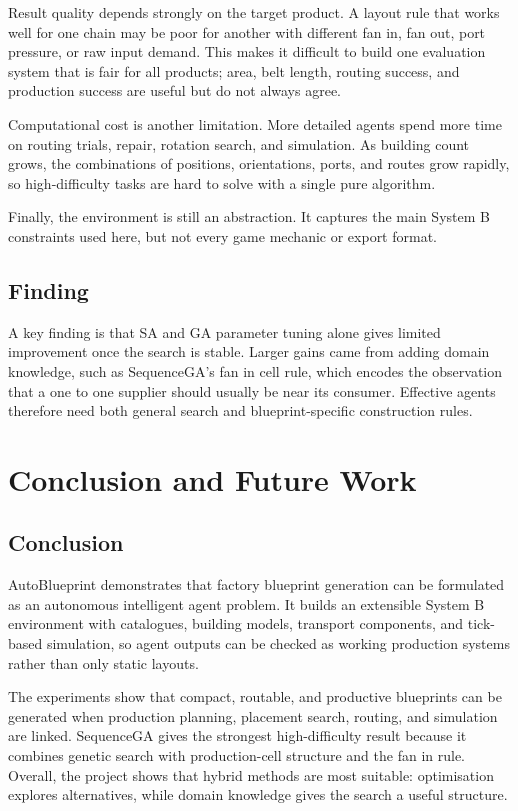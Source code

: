 \documentclass[11pt,a4paper]{article}
\begin{document}
Result quality depends strongly on the target product. A layout rule that works well for one chain may be poor for another with different fan in, fan out, port pressure, or raw input demand. This makes it difficult to build one evaluation system that is fair for all products; area, belt length, routing success, and production success are useful but do not always agree.

Computational cost is another limitation. More detailed agents spend more time on routing trials, repair, rotation search, and simulation. As building count grows, the combinations of positions, orientations, ports, and routes grow rapidly, so high-difficulty tasks are hard to solve with a single pure algorithm.

Finally, the environment is still an abstraction. It captures the main System B constraints used here, but not every game mechanic or export format.

\subsection{Finding}

A key finding is that SA and GA parameter tuning alone gives limited improvement once the search is stable. Larger gains came from adding domain knowledge, such as SequenceGA's fan in cell rule, which encodes the observation that a one to one supplier should usually be near its consumer. Effective agents therefore need both general search and blueprint-specific construction rules.

\section{Conclusion and Future Work}
\label{sec:conclusion}

\subsection{Conclusion}

AutoBlueprint demonstrates that factory blueprint generation can be formulated as an autonomous intelligent agent problem. It builds an extensible System B environment with catalogues, building models, transport components, and tick-based simulation, so agent outputs can be checked as working production systems rather than only static layouts.

The experiments show that compact, routable, and productive blueprints can be generated when production planning, placement search, routing, and simulation are linked. SequenceGA gives the strongest high-difficulty result because it combines genetic search with production-cell structure and the fan in rule. Overall, the project shows that hybrid methods are most suitable: optimisation explores alternatives, while domain knowledge gives the search a useful structure.
\end{document}
